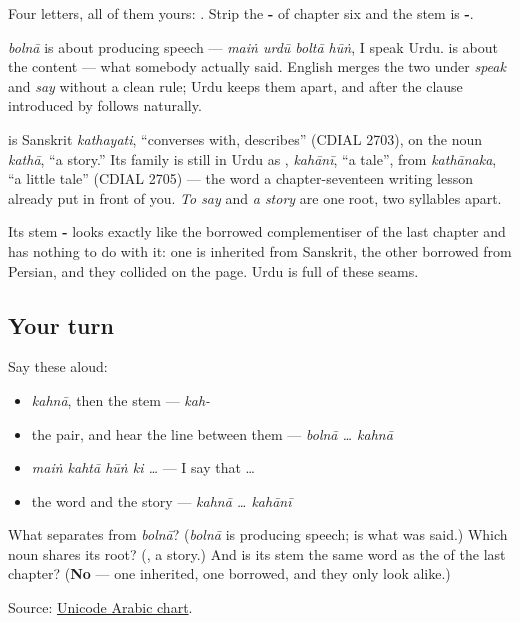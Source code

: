 Four letters, all of them yours: \textbf{} \textbf{} \textbf{} \textbf{}. Strip the \textbf{-} of chapter six and the stem is \textbf{-}.

\emph{bolnā} is about producing speech — \emph{maiṅ urdū boltā hūṅ}, I speak Urdu. \textbf{} is about the content — what somebody actually said. English merges the two under \emph{speak} and \emph{say} without a clean rule; Urdu keeps them apart, and after \textbf{} the clause introduced by \textbf{} follows naturally.

\begin{cousinweb}
\textbf{} is Sanskrit \emph{kathayati}, \textquotedblleft{}converses with, describes\textquotedblright{} (CDIAL 2703), on the noun \emph{kathā}, \textquotedblleft{}a story.\textquotedblright{} Its family is still in Urdu as \textbf{}, \emph{kahānī}, \textquotedblleft{}a tale\textquotedblright{}, from \emph{kathānaka}, \textquotedblleft{}a little tale\textquotedblright{} (CDIAL 2705) — the word a chapter-seventeen writing lesson already put in front of you. \emph{To say} and \emph{a story} are one root, two syllables apart.

Its stem \textbf{-} looks exactly like the borrowed complementiser \textbf{} of the last chapter and has nothing to do with it: one is inherited from Sanskrit, the other borrowed from Persian, and they collided on the page. Urdu is full of these seams.
\end{cousinweb}

\subsection*{Your turn}
Say these aloud:

\begin{itemize}
\raggedright
  \item \emph{kahnā}, then the stem — \emph{kah-}
  \item the pair, and hear the line between them — \emph{bolnā … kahnā}
  \item \emph{maiṅ kahtā hūṅ ki …} — I say that …
  \item the word and the story — \emph{kahnā … kahānī}
\end{itemize}

\begin{tcolorbox}[breakable,colback=teal!4,colframe=teal!35!black,title={Before you move on}]
What separates \textbf{} from \emph{bolnā}? (\emph{bolnā} is producing speech; \textbf{} is what was said.) Which noun shares its root? (\textbf{}, a story.) And is its stem the same word as the \textbf{} of the last chapter? (\textbf{No} — one inherited, one borrowed, and they only look alike.)

Source: \href{https://www.unicode.org/charts/PDF/U0600.pdf}{Unicode Arabic chart}.
\end{tcolorbox}
